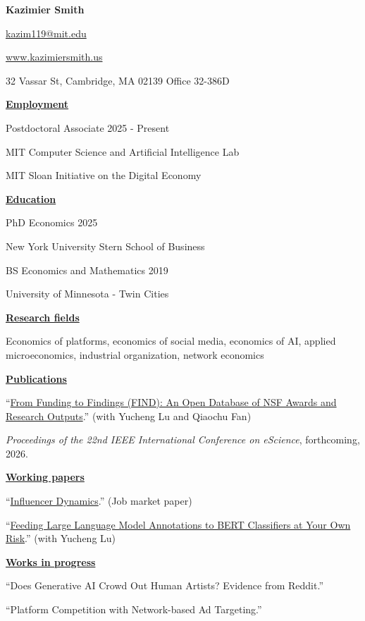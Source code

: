 \documentclass[11pt]{article}
\newcommand{\sect}[1]{\vspace{0.5em}\underline{\textbf{#1}}}
\begin{document}
\begin{center}
{\LARGE \textbf{Kazimier Smith}}

\href{mailto:kazim119@mit.edu}{kazim119@mit.edu}

\href{https://www.kazimiersmith.us}{www.kazimiersmith.us}

32 Vassar St, Cambridge, MA 02139 Office 32-386D
\end{center}

\sect{Employment}

Postdoctoral Associate \hfill 2025 - Present

MIT Computer Science and Artificial Intelligence Lab

MIT Sloan Initiative on the Digital Economy

\sect{Education}

PhD Economics \hfill 2025

\hspace{2em}New York University Stern School of Business

BS Economics and Mathematics \hfill 2019

\hspace{2em}University of Minnesota - Twin Cities

\sect{Research fields}

Economics of platforms, economics of social media, economics of AI,
applied microeconomics, industrial organization, network economics

\sect{Publications}

``\href{https://kazimiersmith.github.io/docs/nsf_output.pdf}{From Funding to Findings (FIND): An Open Database of NSF Awards and Research Outputs}.''
(with Yucheng Lu and Qiaochu Fan)

\textit{Proceedings of the 22nd IEEE International Conference on eScience}, forthcoming, 2026.

\sect{Working papers}

``\href{https://kazimiersmith.github.io/docs/influencer_dynamics.pdf}{Influencer Dynamics}.''
(Job market paper)

``\href{https://kazimiersmith.github.io/docs/llm_bert.pdf}{Feeding Large Language Model Annotations to BERT Classifiers at Your Own Risk}.''
(with Yucheng Lu)

\sect{Works in progress}

``Does Generative AI Crowd Out Human Artists? Evidence from Reddit.''

``Platform Competition with Network-based Ad Targeting.''
\end{document}
